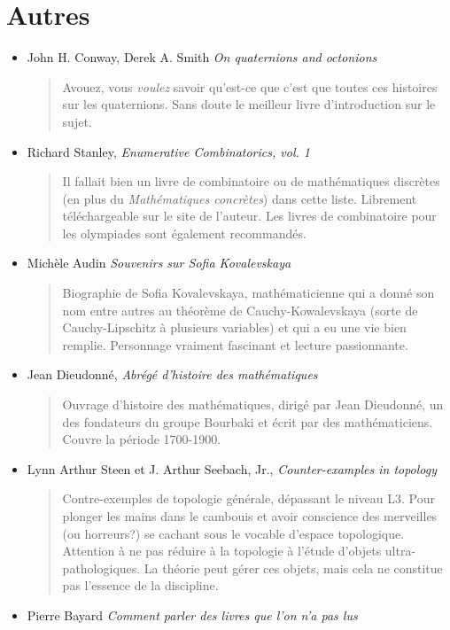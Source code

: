 \documentclass{article}
\begin{document}
\section{Autres}


\begin{itemize}
\item John H. Conway, Derek A. Smith \emph{On quaternions and octonions}
\begin{quote}
Avouez, vous \emph{voulez} savoir qu'est-ce que c'est que toutes ces histoires sur les quaternions. Sans doute le meilleur livre d'introduction sur le sujet.
\end{quote}
\item Richard Stanley, \emph{Enumerative Combinatorics, vol. 1}
\begin{quote}
Il fallait bien un livre de combinatoire ou de mathématiques discrètes (en plus du \emph{Mathématiques concrètes}) dans cette liste. Librement téléchargeable sur le site de l'auteur. Les livres de combinatoire pour les olympiades sont également recommandés.
\end{quote}
\item Michèle Audin \emph{Souvenirs sur Sofia Kovalevskaya}
\begin{quote}
Biographie de Sofia Kovalevskaya, mathématicienne qui a donné son nom entre autres au théorème de Cauchy-Kowalevskaya (sorte de Cauchy-Lipschitz à plusieurs variables) et qui a eu une vie bien remplie. Personnage vraiment fascinant et lecture passionnante.
\end{quote}
\item Jean Dieudonné, \emph{Abrégé d'histoire des mathématiques}
\begin{quote}
Ouvrage d'histoire des mathématiques, dirigé par Jean Dieudonné, un des fondateurs du groupe Bourbaki et écrit par des mathématiciens. Couvre la période 1700-1900. 
\end{quote}
\item Lynn Arthur Steen et J. Arthur Seebach, Jr., \emph{Counter-examples in topology}
\begin{quote}
Contre-exemples de topologie générale, dépassant le niveau L3. Pour plonger les mains dans le cambouis et avoir conscience des  merveilles (ou horreurs?) se cachant sous le vocable d'\og espace topologique\fg. Attention à ne pas réduire à la topologie à l'étude d'objets ultra-pathologiques. La théorie peut gérer ces objets, mais cela ne constitue pas l'essence de la discipline.
\end{quote}
\item Pierre Bayard \emph{Comment parler des livres que l'on n'a pas lus}
\end{itemize}
\end{document}
